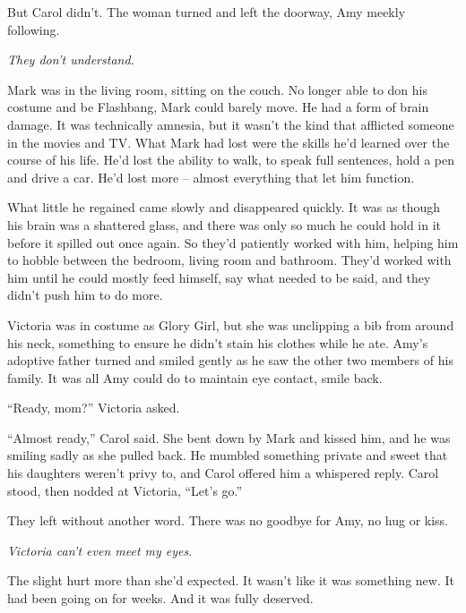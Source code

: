 But Carol didn't.  The woman turned and left the doorway, Amy meekly following.



\emph{They don't understand.}



Mark was in the living room, sitting on the couch.  No longer able to don his costume and be Flashbang, Mark could barely move.  He had a form of brain damage.  It was technically amnesia, but it wasn't the kind that afflicted someone in the movies and TV.  What Mark had lost were the skills he'd learned over the course of his life.  He'd lost the ability to walk, to speak full sentences, hold a pen and drive a car.  He'd lost more – almost everything that let him function.



What little he regained came slowly and disappeared quickly.  It was as though his brain was a shattered glass, and there was only so much he could hold in it before it spilled out once again.  So they'd patiently worked with him, helping him to hobble between the bedroom, living room and bathroom.  They'd worked with him until he could mostly feed himself, say what needed to be said, and they didn't push him to do more.



Victoria was in costume as Glory Girl, but she was unclipping a bib from around his neck, something to ensure he didn't stain his clothes while he ate.  Amy's adoptive father turned and smiled gently as he saw the other two members of his family.  It was all Amy could do to maintain eye contact, smile back.



``Ready, mom?'' Victoria asked.



``Almost ready,'' Carol said.  She bent down by Mark and kissed him, and he was smiling sadly as she pulled back.  He mumbled something private and sweet that his daughters weren't privy  to, and Carol offered him a whispered reply.  Carol stood, then nodded at Victoria, ``Let's go.''



They left without another word.  There was no goodbye for Amy, no hug or kiss.



\emph{Victoria can't even meet my eyes}.



The slight hurt more than she'd expected.  It wasn't like it was something new.  It had been going on for weeks.  And it was fully deserved.



